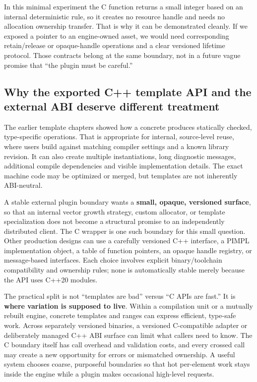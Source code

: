 In this minimal experiment the C function returns a small integer based on an internal deterministic rule, so it creates no resource handle and needs no allocation ownership transfer. That is why it can be demonstrated cleanly. If we exposed a pointer to an engine-owned asset, we would need corresponding retain/release or opaque-handle operations and a clear versioned lifetime protocol. Those contracts belong at the same boundary, not in a future vague promise that ``the plugin must be careful.''

\subsection{Why the exported C++ template API and the external ABI deserve different treatment}\label{05-engine-i-ch006-why-the-exported-c-template-api-and-the-external-abi-deserve-different-treatment}

\hypertarget{05-engine-i-ch006-why-the-exported-c-template-api-and-the-external-abi-deserve-different-treatment}{}

The earlier template chapters showed how a concrete  produces statically checked, type-specific operations. That is appropriate for internal, source-level reuse, where users build against matching compiler settings and a known library revision. It can also create multiple instantiations, long diagnostic messages, additional compile dependencies and visible implementation details. The exact machine code may be optimized or merged, but templates are not inherently ABI-neutral.

A stable external plugin boundary wants a \textbf{small, opaque, versioned surface}, so that an internal vector growth strategy, custom allocator, or template specialization does not become a structural promise to an independently distributed client. The C wrapper is one such boundary for this small question. Other production designs can use a carefully versioned C++ interface, a PIMPL implementation object, a table of function pointers, an opaque handle registry, or message-based interfaces. Each choice involves explicit binary/toolchain compatibility and ownership rules; none is automatically stable merely because the API uses C++20 modules.

The practical split is not ``templates are bad'' versus ``C APIs are fast.'' It is \textbf{where variation is supposed to live}. Within a compilation unit or a mutually rebuilt engine, concrete templates and ranges can express efficient, type-safe work. Across separately versioned binaries, a versioned C-compatible adapter or deliberately managed C++ ABI surface can limit what callers need to know. The C boundary itself has call overhead and validation costs, and every crossed call may create a new opportunity for errors or mismatched ownership. A useful system chooses coarse, purposeful boundaries so that hot per-element work stays inside the engine while a plugin makes occasional high-level requests.

